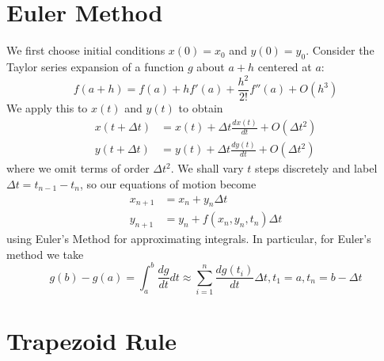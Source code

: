 \documentclass[12pt]{report}
\begin{document}
\section{Euler Method}

\begin{proc}{}{}
        We first choose initial conditions $x(0) = x_0$ and $y(0) = y_0$. Consider the Taylor series expansion of a function $g$ about $a+h$ centered at $a$:\begin{equation}
                f(a+h) = f(a) + hf'(a) + \frac{h^2}{2!}f''(a) + O(h^3)
        \end{equation}
        We apply this to $x(t)$ and $y(t)$ to obtain \begin{align}
                x(t + \Delta t) &= x(t) + \Delta t \frac{dx(t)}{dt} + O(\Delta t^2)\\
                y(t + \Delta t) &= y(t) + \Delta t \frac{dy(t)}{dt} + O(\Delta t^2)
        \end{align}
        where we omit terms of order $\Delta t^2$. We shall vary $t$ steps discretely and label $\Delta t = t_{n-1} - t_n$, so our equations of motion become \begin{align}
                x_{n+1} &= x_n + y_n\Delta t \\
                y_{n+1} &= y_n + f(x_n,y_n,t_n)\Delta t
        \end{align}
        using Euler's Method for approximating integrals. In particular, for Euler's method we take \begin{equation}
                g(b) - g(a) = \int_a^b\frac{dg}{dt}dt \approx \sum_{i=1}^n\frac{dg(t_i)}{dt}\Delta t, t_1 = a, t_n = b - \Delta t
        \end{equation}
\end{proc}


\section{Trapezoid Rule}
\end{document}
